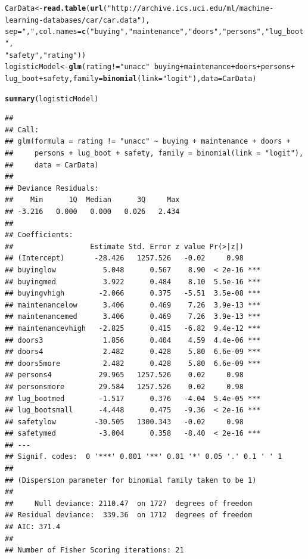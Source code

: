 \documentclass[12pt, a4paper, oneside]{article}\usepackage[]{graphicx}\usepackage[]{color}
\makeatletter
\newcommand{\hlstr}[1]{\textcolor[rgb]{0.192,0.494,0.8}{#1}}%
\newcommand{\hlkwd}[1]{\textcolor[rgb]{0.737,0.353,0.396}{\textbf{#1}}}%
\newenvironment{kframe}{%
 \def\at@end@of@kframe{}%
 \ifinner\ifhmode%
  \def\at@end@of@kframe{\end{minipage}}%
  \begin{minipage}{\columnwidth}%
 \fi\fi%
 \def\FrameCommand##1{\hskip\@totalleftmargin \hskip-\fboxsep
 \colorbox{shadecolor}{##1}\hskip-\fboxsep
     \hskip-\linewidth \hskip-\@totalleftmargin \hskip\columnwidth}%
 \MakeFramed {\advance\hsize-\width
   \@totalleftmargin\z@ \linewidth\hsize
   \@setminipage}}%
 {\par\unskip\endMakeFramed%
 \at@end@of@kframe}
\newenvironment{knitrout}{}{} %
\makeatother
\begin{document}
\begin{knitrout}
\color{fgcolor}\begin{kframe}
\begin{alltt}
CarData <- \hlkwd{read.table}(\hlkwd{url}(\hlstr{"http://archive.ics.uci.edu/ml/machine-learning-databases/car/car.data"}), 
    sep = \hlstr{","}, col.names = \hlkwd{c}(\hlstr{"buying"}, \hlstr{"maintenance"}, \hlstr{"doors"}, \hlstr{"persons"}, \hlstr{"lug_boot"}, 
        \hlstr{"safety"}, \hlstr{"rating"}))
logisticModel <- \hlkwd{glm}(rating != \hlstr{"unacc"} ~ buying + maintenance + doors + persons + 
    lug_boot + safety, family = \hlkwd{binomial}(link = \hlstr{"logit"}), data = CarData)
\end{alltt}


{\ttfamily\noindent\color{warningcolor}{\#\# Warning: glm.fit: fitted probabilities numerically 0 or 1 occurred}}\begin{alltt}
\hlkwd{summary}(logisticModel)
\end{alltt}
\begin{verbatim}
## 
## Call:
## glm(formula = rating != "unacc" ~ buying + maintenance + doors + 
##     persons + lug_boot + safety, family = binomial(link = "logit"), 
##     data = CarData)
## 
## Deviance Residuals: 
##    Min      1Q  Median      3Q     Max  
## -3.216   0.000   0.000   0.026   2.434  
## 
## Coefficients:
##                  Estimate Std. Error z value Pr(>|z|)    
## (Intercept)       -28.426   1257.526   -0.02     0.98    
## buyinglow           5.048      0.567    8.90  < 2e-16 ***
## buyingmed           3.922      0.484    8.10  5.5e-16 ***
## buyingvhigh        -2.066      0.375   -5.51  3.5e-08 ***
## maintenancelow      3.406      0.469    7.26  3.9e-13 ***
## maintenancemed      3.406      0.469    7.26  3.9e-13 ***
## maintenancevhigh   -2.825      0.415   -6.82  9.4e-12 ***
## doors3              1.856      0.404    4.59  4.4e-06 ***
## doors4              2.482      0.428    5.80  6.6e-09 ***
## doors5more          2.482      0.428    5.80  6.6e-09 ***
## persons4           29.965   1257.526    0.02     0.98    
## personsmore        29.584   1257.526    0.02     0.98    
## lug_bootmed        -1.517      0.376   -4.04  5.4e-05 ***
## lug_bootsmall      -4.448      0.475   -9.36  < 2e-16 ***
## safetylow         -30.505   1300.343   -0.02     0.98    
## safetymed          -3.004      0.358   -8.40  < 2e-16 ***
## ---
## Signif. codes:  0 '***' 0.001 '**' 0.01 '*' 0.05 '.' 0.1 ' ' 1 
## 
## (Dispersion parameter for binomial family taken to be 1)
## 
##     Null deviance: 2110.47  on 1727  degrees of freedom
## Residual deviance:  339.36  on 1712  degrees of freedom
## AIC: 371.4
## 
## Number of Fisher Scoring iterations: 21
\end{verbatim}
\end{kframe}
\end{knitrout}
\end{document}
